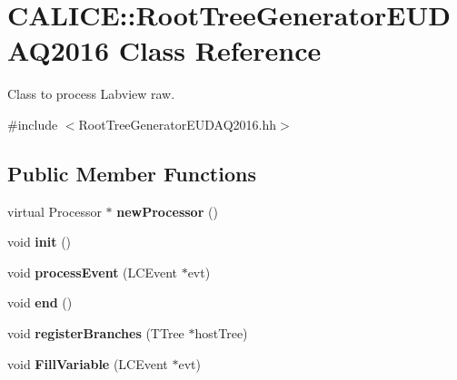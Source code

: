 \section{CALICE::RootTreeGeneratorEUDAQ2016 Class Reference}
\label{classCALICE_1_1RootTreeGeneratorEUDAQ2016}


Class to process Labview raw.  


{\ttfamily \#include $<$RootTreeGeneratorEUDAQ2016.hh$>$}\subsection*{Public Member Functions}
\begin{DoxyCompactItemize}
\item 
virtual Processor $\ast$ {\bfseries newProcessor} ()\label{classCALICE_1_1RootTreeGeneratorEUDAQ2016_adb6517ac6d1e813d05d19d0a118caa8c}

\item 
void {\bfseries init} ()\label{classCALICE_1_1RootTreeGeneratorEUDAQ2016_a2eb9c18fbb3422bd9a6800565f4c9d07}

\item 
void {\bfseries processEvent} (LCEvent $\ast$evt)\label{classCALICE_1_1RootTreeGeneratorEUDAQ2016_a5d169a6cdf7f3471a2a150dd4723f377}

\item 
void {\bfseries end} ()\label{classCALICE_1_1RootTreeGeneratorEUDAQ2016_acc5e873edc240b1789ba394087e2c26e}

\item 
void {\bfseries registerBranches} (TTree $\ast$hostTree)\label{classCALICE_1_1RootTreeGeneratorEUDAQ2016_a56d658a01150d2c00b4a5c37807f17bf}

\item 
void {\bfseries FillVariable} (LCEvent $\ast$evt)\label{classCALICE_1_1RootTreeGeneratorEUDAQ2016_a1e983591213d74cf08fc48f0ac41bfe9}

\end{DoxyCompactItemize}
